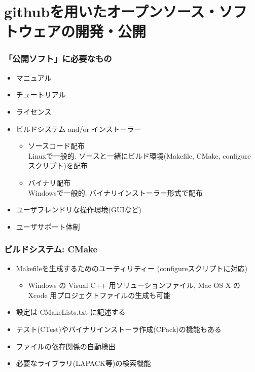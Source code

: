 \section{githubを用いたオープンソース・ソフトウェアの開発・公開}

\begin{frame}
  \frametitle{「公開ソフト」に必要なもの}
  \begin{itemize}
  \item マニュアル
  \item チュートリアル
  \item ライセンス
  \item ビルドシステム and/or インストーラー
    \begin{itemize}
    \item ソースコード配布 \\
      Linuxで一般的. ソースと一緒にビルド環境(Makefile, CMake, configure スクリプト)を配布
    \item バイナリ配布 \\
      Windowsで一般的. バイナリインストーラー形式で配布
    \end{itemize}
  \item ユーザフレンドリな操作環境(GUIなど)
  \item ユーザサポート体制
  \end{itemize}
\end{frame}

\begin{frame}
  \frametitle{ビルドシステム: CMake}
  \begin{itemize}
    \setlength{\itemsep}{1em}
  \item Makefileを生成するためのユーティリティー (configureスクリプトに対応)
    \begin{itemize}
    \item Windows の Visual C++ 用ソリューションファイル, Mac OS X の Xcode 用プロジェクトファイルの生成も可能
    \end{itemize}
  \item 設定は CMakeLists.txt に記述する
  \item テスト(CTest)やバイナリインストーラ作成(CPack)の機能もある
  \item ファイルの依存関係の自動検出
  \item 必要なライブラリ(LAPACK等)の検索機能
  \end{itemize}
\end{frame}


